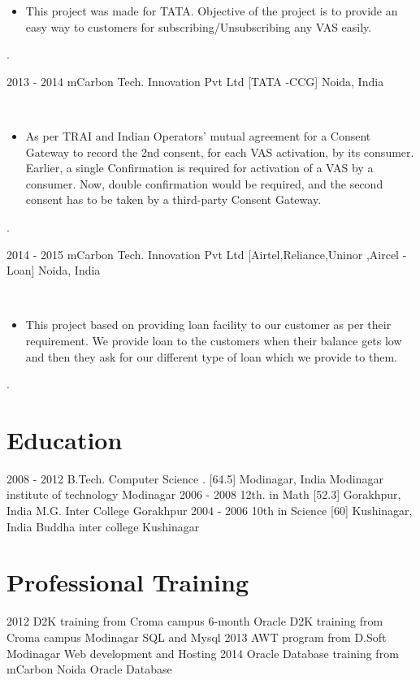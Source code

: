 \documentclass[]{cs-style} %
\begin{document}
\begin{entrylist}
{\begin{itemize}
\item  This project was made for TATA. Objective of the project is to provide an easy way to customers for subscribing/Unsubscribing any VAS easily.
\end{itemize}
.\\}
\entry
  {2013 - 2014}
  {mCarbon Tech. Innovation Pvt Ltd [TATA -CCG]}
  {Noida, India}
  {\
\begin{itemize}
\item  As per TRAI and Indian Operators’ mutual agreement for a Consent Gateway to record the 2nd consent, for each VAS activation, by its consumer. Earlier, a single Confirmation is required for activation of a VAS by a consumer. Now, double confirmation would be required, and the second consent has to be taken by a third-party Consent Gateway.
\end{itemize}
.\\}
\entry
  {2014 - 2015}
  {mCarbon Tech. Innovation Pvt Ltd [Airtel,Reliance,Uninor ,Aircel -Loan]}
  {Noida, India}
  {\
\begin{itemize}
\item  This project based on providing loan facility to our customer as per their requirement. We provide loan to the customers   when their balance gets low and then they ask for our different type of loan which we provide to them.
\end{itemize}
.\\}
\end{entrylist}
\section{Education}
\begin{entrylist}
\entry
{2008 - 2012}
{B.Tech. Computer Science {\normalfont . [64.5]}}
{Modinagar, India}
{Modinagar institute of technology Modinagar}
\entry
{2006 - 2008}
{12th. {\normalfont in Math [52.3]}}
{Gorakhpur, India}
{M.G. Inter College Gorakhpur}
\entry
{2004 - 2006}
{10th {\normalfont in Science [60]}}
{Kushinagar, India}
{Buddha inter college Kushinagar}
\end{entrylist} 
\section{Professional Training}
\begin{entrylist}
\entry
{2012}
{D2K training from Croma campus}
{6-month Oracle D2K  training from Croma campus Modinagar}
{SQL and Mysql}
\entry
{2013}
{AWT program from D.Soft}
{Modinagar}
{Web development and Hosting}
\entry
{2014}
{Oracle Database training  from  mCarbon}
{Noida}
{Oracle Database}
\end{entrylist}
\end{document}
